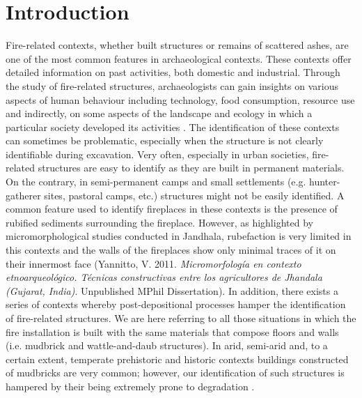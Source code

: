 \documentclass[authoryear,preprint,review,12pt]{elsarticle}
\begin{document}
\linenumbers

\section{Introduction}
\label{sec:1}
Fire-related contexts, whether built structures or remains of scattered ashes, are one of the most common features in archaeological contexts. These contexts offer detailed information on past activities, both domestic and industrial. Through the study of fire-related structures, archaeologists can gain insights on various aspects of human behaviour including technology, food consumption, resource use and indirectly, on some aspects of the landscape and ecology in which a particular society developed its activities \citep{Asouti2003,Chabal1997,Meyer2003,ShahackGross2004}. The identification of these contexts can sometimes be problematic, especially when the structure is not clearly identifiable during excavation. Very often, especially in urban societies, fire-related structures are easy to identify as they are built in permanent materials. On the contrary, in semi-permanent camps and small settlements (e.g. hunter-gatherer sites, pastoral camps, etc.) structures might not be easily identified. A common feature used to identify fireplaces in these contexts is the presence of rubified sediments surrounding the fireplace. However, as highlighted by micromorphological studies conducted in Jandhala, rubefaction is very limited in this contexts and the walls of the fireplaces show only minimal traces of it on their innermost face (Yannitto, V. 2011. \textit{Micromorfología en contexto etnoarqueológico. Técnicas constructivas entre los agricultores de Jhandala (Gujarat, India)}. Unpublished MPhil Dissertation). In addition, there exists a series of contexts whereby post-depositional processes hamper the identification of fire-related structures. We are here referring to all those situations in which the fire installation is built with the same materials that compose floors and walls (i.e. mudbrick and wattle-and-daub structures). In arid, semi-arid and, to a certain extent, temperate prehistoric and historic contexts buildings constructed of mudbricks are very common; however, our identification of such structures is hampered by their being extremely prone to degradation \citep{Friesem2014}.
\end{document}
